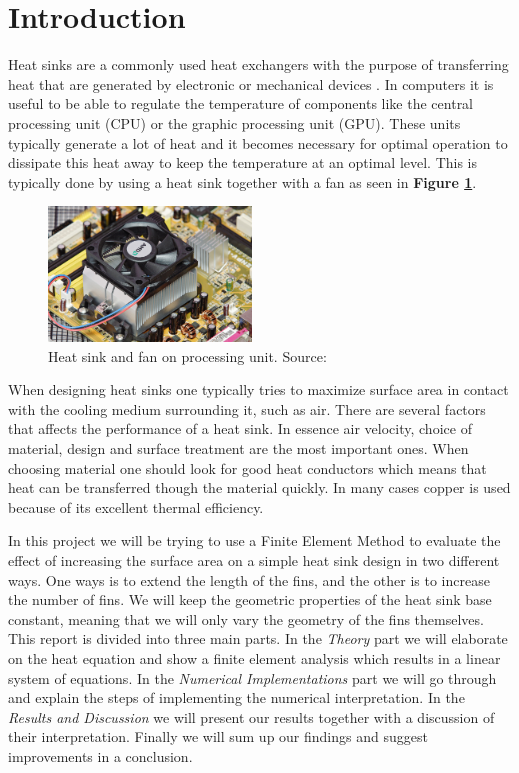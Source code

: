 \section{Introduction}
Heat sinks are a commonly used heat exchangers with the purpose of transferring heat that are generated by electronic or mechanical devices \cite{wiki_hs}. In computers it is useful to be able to regulate the temperature of components like the central processing unit (CPU) or the graphic processing unit	(GPU). These units typically generate a lot of heat and it becomes necessary for optimal operation to dissipate this heat away to keep the temperature at an optimal level. This is typically done by using a heat sink together with a fan as seen in \textbf{Figure \ref{fig:heatsink_and_fan}}. 

\begin{figure}
	\begin{center}
		\includegraphics[width=0.48\textwidth]{../figures/heatsink_and_fan.jpg}
	\end{center}
	\caption{Heat sink and fan on processing unit. Source: \cite{wiki_hs}}
    \label{fig:heatsink_and_fan}
\end{figure}

When designing heat sinks one typically tries to maximize surface area in contact with the cooling medium surrounding it, such as air. There are several factors that affects the performance of a heat sink. In essence air velocity, choice of material, design and surface treatment are the most important ones. When choosing material one should look for good heat conductors which means that heat can be transferred though the material quickly. In many cases copper is used because of its excellent thermal efficiency.

In this project we will be trying to use a Finite Element Method to evaluate the effect of increasing the surface area on a simple heat sink design in two different ways. One ways is to extend the length of the fins, and the other is to increase the number of fins. We will keep the geometric properties of the heat sink base constant, meaning that we will only vary the geometry of the fins themselves. This report is divided into three main parts. In the \textit{Theory} part we will elaborate on the heat equation and show a finite element analysis which results in a linear system of equations. In the \textit{Numerical Implementations} part we will go through and explain the steps of implementing the numerical interpretation. In the \textit{Results and Discussion} we will present our results together with a discussion of their interpretation. Finally we will sum up our findings and suggest improvements in a conclusion. %